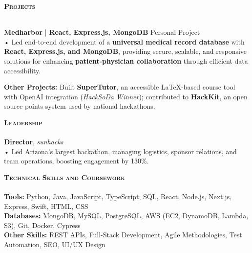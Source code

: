 \documentclass[10pt]{article}
\newcommand{\lineunder} {
    \vspace*{-8pt} \\
    \hspace*{-18pt} \hrulefill \\
}
\newcommand{\header} [1] {
    {\hspace*{-15pt}\vspace*{3pt} \textsc{#1}}
    \vspace*{-2pt} \lineunder
}
\begin{document}
\header{\textbf{Projects}}
\vspace{0.5mm}

\textbf{Medharbor} | \textbf{React, Express.js, MongoDB} \hfill Personal Project \\
\vspace{1mm}
  • Led end-to-end development of a \textbf{universal medical record database} with \textbf{React, Express.js, and MongoDB}, providing secure, scalable, and responsive solutions for enhancing \textbf{patient-physician collaboration} through efficient data accessibility.

  \vspace{2mm}
\textbf{Other Projects:} Built \textbf{SuperTutor}, an accessible LaTeX-based course tool with OpenAI integration (\textit{HackSoDa Winner}); contributed to \textbf{HackKit}, an open source points system used by national hackathons.

\header{\textbf{Leadership}}
\vspace{0.5mm}
\textbf{Director}, \textit{sunhacks} \\
\vspace{1mm}
• Led Arizona’s largest hackathon, managing logistics, sponsor relations, and team operations, boosting engagement by 130\%.


\header{\textbf{Technical Skills and Coursework}}
\vspace{0.5mm}
\textbf{Tools:} Python, Java, JavaScript, TypeScript, SQL, React, Node.js, Next.js, Express, Swift, HTML, CSS \\
\vspace{0.5mm}
\textbf{Databases:} MongoDB, MySQL, PostgreSQL, AWS (EC2, DynamoDB, Lambda, S3), Git, Docker, Cypress \\
\vspace{0.5mm}
\textbf{Other Skills:} REST APIs, Full-Stack Development, Agile Methodologies, Test Automation, SEO, UI/UX Design \\
\vspace{2mm}
\end{document}
